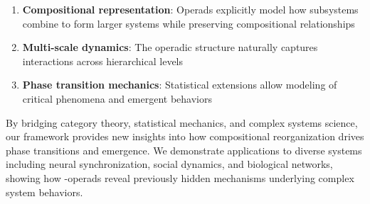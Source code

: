 \begin{enumerate}[leftmargin=*]
  \item \textbf{Compositional representation}: Operads explicitly model how subsystems combine to form larger systems while preserving compositional relationships
  \item \textbf{Multi-scale dynamics}: The operadic structure naturally captures interactions across hierarchical levels
  \item \textbf{Phase transition mechanics}: Statistical extensions allow modeling of critical phenomena and emergent behaviors
\end{enumerate}

By bridging category theory, statistical mechanics, and complex systems science, our framework provides new insights into how compositional reorganization drives phase transitions and emergence. We demonstrate applications to diverse systems including neural synchronization, social dynamics, and biological networks, showing how \sigma-operads reveal previously hidden mechanisms underlying complex system behaviors.